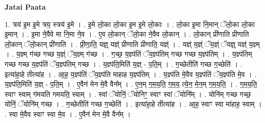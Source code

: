 \documentclass[17pt]{extarticle}
\begin{document}
\textbf{Jatai Paata} \newline

1. त्रय॑ इ॒म इ॒मे त्रय॒ स्त्रय॑ इ॒मे । . इ॒मे लो॒का लो॒का इ॒म इ॒मे लो॒काः । . लो॒का इ॒मा नि॒मान् ॅलो॒का लो॒का इ॒मान् । . इ॒मा ने॒वैवे मा नि॒मा ने॒व । . ए॒व लो॒कान् ॅलो॒का ने॒वैव लो॒कान् । . लो॒कान् प्री॑णाति प्रीणाति लो॒कान् ॅलो॒कान् प्री॑णाति । . प्री॒णा॒ति॒ यज्ञ्॒ यज्ञ्॑ प्रीणाति प्रीणाति॒ यज्ञ्॑ । . यज्ञ्॑ य॒ज्ञ्ं ॅय॒ज्ञ्ं ॅयज्ञ्॒ यज्ञ्॑ य॒ज्ञ्म् । . य॒ज्ञ्म् ग॑च्छ गच्छ य॒ज्ञ्ं ॅय॒ज्ञ्म् ग॑च्छ । . ग॒च्छ॒ य॒ज्ञ्प॑तिं ॅय॒ज्ञ्प॑तिम् गच्छ गच्छ य॒ज्ञ्प॑तिम् । . य॒ज्ञ्प॑तिम् गच्छ गच्छ य॒ज्ञ्प॑तिं ॅय॒ज्ञ्प॑तिम् गच्छ । . य॒ज्ञ्प॑ति॒मिति॑ य॒ज्ञ् - प॒ति॒म् । . ग॒च्छेतीति॑ गच्छ ग॒च्छेति॑ । . इत्या॑हा॒हे तीत्या॑ह । . आ॒ह॒ य॒ज्ञ्प॑तिं ॅय॒ज्ञ्प॑ति माहाह य॒ज्ञ्प॑तिम् । . य॒ज्ञ्प॑ति मे॒वैव य॒ज्ञ्प॑तिं ॅय॒ज्ञ्प॑ति मे॒व । . य॒ज्ञ्प॑ति॒मिति॑ य॒ज्ञ् - प॒ति॒म् । . ए॒वैन॑ मेन मे॒वै वैन᳚म् । . ए॒न॒म् ग॒म॒य॒ति॒ ग॒म॒य॒ त्ये॒न॒ मे॒न॒म् ग॒म॒य॒ति॒ । . ग॒म॒य॒ति॒ स्वाꣳ स्वाम् ग॑मयति गमयति॒ स्वाम् । . स्वां ॅयोनिं॒ ॅयोनिꣳ॒॒ स्वाꣳ स्वां ॅयोनि᳚म् । . योनि॑म् गच्छ गच्छ॒ योनिं॒ ॅयोनि॑म् गच्छ । . ग॒च्छेतीति॑ गच्छ ग॒च्छेति॑ । . इत्या॑हा॒हे तीत्या॑ह । . आ॒ह॒ स्वाꣳ स्वा मा॑हाह॒ स्वाम् । . स्वा मे॒वैव स्वाꣳ स्वा मे॒व । . ए॒वैन॑ मेन मे॒वै वैन᳚म् । \newline
\end{document}
